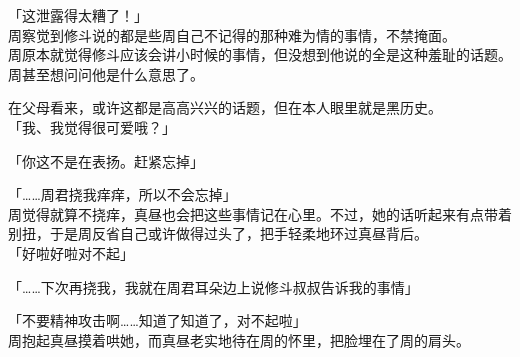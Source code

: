 「这泄露得太糟了！」\\

周察觉到修斗说的都是些周自己不记得的那种难为情的事情，不禁掩面。\\

周原本就觉得修斗应该会讲小时候的事情，但没想到他说的全是这种羞耻的话题。周甚至想问问他是什么意思了。

在父母看来，或许这都是高高兴兴的话题，但在本人眼里就是黑历史。\\

「我、我觉得很可爱哦？」

「你这不是在表扬。赶紧忘掉」

「……周君挠我痒痒，所以不会忘掉」\\

周觉得就算不挠痒，真昼也会把这些事情记在心里。不过，她的话听起来有点带着别扭，于是周反省自己或许做得过头了，把手轻柔地环过真昼背后。\\

「好啦好啦对不起」

「……下次再挠我，我就在周君耳朵边上说修斗叔叔告诉我的事情」

「不要精神攻击啊……知道了知道了，对不起啦」\\

周抱起真昼摸着哄她，而真昼老实地待在周的怀里，把脸埋在了周的肩头。
